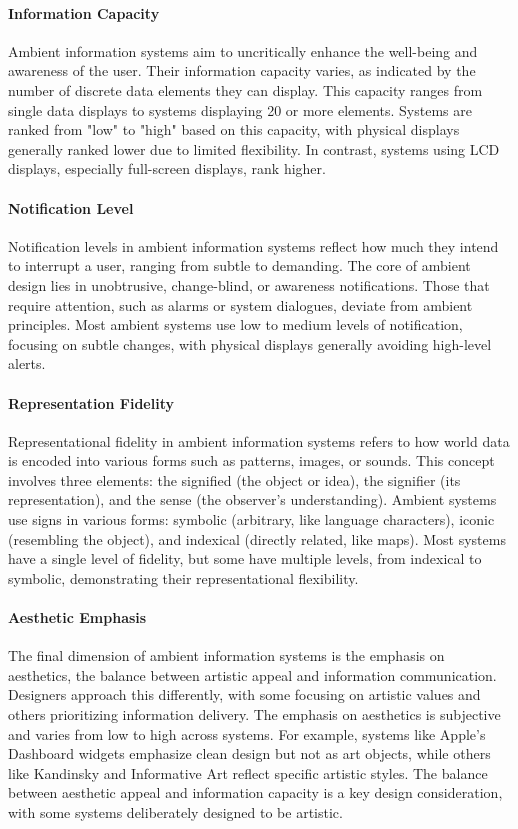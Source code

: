 \documentclass[
  a4paper,  %
  twoside,  %
  bibliography=totoc,
  headsepline,
  cleardoublepage=empty,
  parskip=half,
  draft=false
]{scrbook}
\begin{document}
\paragraph{Information Capacity}
Ambient information systems aim to uncritically enhance the well-being and awareness of the user. Their information capacity varies, as indicated by the number of discrete data elements they can display. This capacity ranges from single data displays to systems displaying 20 or more elements. Systems are ranked from "low" to "high" based on this capacity, with physical displays generally ranked lower due to limited flexibility. In contrast, systems using LCD displays, especially full-screen displays, rank higher.
\paragraph{Notification Level}
Notification levels in ambient information systems reflect how much they intend to interrupt a user, ranging from subtle to demanding. The core of ambient design lies in unobtrusive, change-blind, or awareness notifications. Those that require attention, such as alarms or system dialogues, deviate from ambient principles. Most ambient systems use low to medium levels of notification, focusing on subtle changes, with physical displays generally avoiding high-level alerts.
\paragraph{Representation Fidelity}
Representational fidelity in ambient information systems refers to how world data is encoded into various forms such as patterns, images, or sounds. This concept involves three elements: the signified (the object or idea), the signifier (its representation), and the sense (the observer's understanding). Ambient systems use signs in various forms: symbolic (arbitrary, like language characters), iconic (resembling the object), and indexical (directly related, like maps). Most systems have a single level of fidelity, but some have multiple levels, from indexical to symbolic, demonstrating their representational flexibility.
\paragraph{Aesthetic Emphasis}
The final dimension of ambient information systems is the emphasis on aesthetics, the balance between artistic appeal and information communication. Designers approach this differently, with some focusing on artistic values and others prioritizing information delivery. The emphasis on aesthetics is subjective and varies from low to high across systems. For example, systems like Apple's Dashboard widgets emphasize clean design but not as art objects, while others like Kandinsky and Informative Art reflect specific artistic styles. The balance between aesthetic appeal and information capacity is a key design consideration, with some systems deliberately designed to be artistic.
\end{document}
